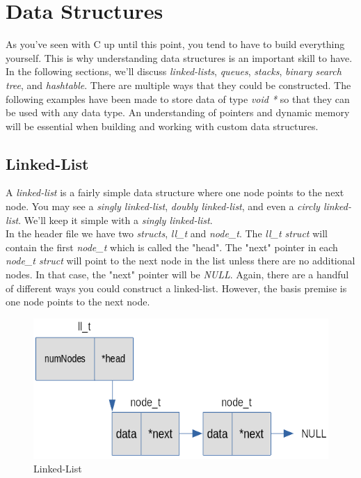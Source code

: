 \documentclass[../main.tex]{subfiles}
\begin{document}
	\chapter{Data Structures}
	As you've seen with C up until this point, you tend to have to build everything yourself.  This is why understanding data structures is an important skill to have.  In the following sections, we'll discuss \textit{linked-lists}, \textit{queues}, \textit{stacks}, \textit{binary search tree}, and \textit{hashtable}.  There are multiple ways that they could be constructed.  The following examples have been made to store data of type \textit{void *} so that they can be used with any data type.  An understanding of pointers and dynamic memory will be essential when building and working with custom data structures.
	
	\section{Linked-List}
	A \textit{linked-list} is a fairly simple data structure where one node points to the next node.  You may see a \textit{singly linked-list}, \textit{doubly linked-list}, and even a \textit{circly linked-list}.  We'll keep it simple with a \textit{singly linked-list}.\\
	
	
	
	In the header file we have two \textit{structs}, \textit{ll\_t} and \textit{node\_t}.  The \textit{ll\_t struct} will contain the first \textit{node\_t} which is called the "head".  The "next" pointer in each \textit{node\_t struct} will point to the next node in the list unless there are no additional nodes.  In that case, the "next" pointer will be \textit{NULL}.  Again, there are a handful of different ways you could construct a linked-list.  However, the basis premise is one node points to the next node.
	
	\begin{figure}[h]
		\centering\includegraphics[scale=0.5]{linkedlist.png}
		\caption{Linked-List}
		\label{fig:linked_list}
	\end{figure}
\end{document}

